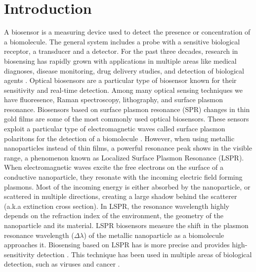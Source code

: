 \chapter{Introduction} \label{chap:intro}

A biosensor is a measuring device used to detect the presence or concentration of a biomolecule. The general system includes 
a probe with a sensitive biological receptor, a transducer and a detector. For the past three decades, research in biosensing 
has rapidly grown with applications in multiple areas like medical diagnoses, disease monitoring, drug delivery studies, 
and detection of biological agents \cite{Turner2000, Mohanty2006, Mehrotra2016}. Optical biosensors are a particular type of biosensor 
known for their sensitivity and real-time detection. Among many optical sensing techniques we have fluoresence, Raman spectroscopy, lithography, 
and surface plasmon resonance. Biosensors based on surface plasmon resonance (SPR) changes in thin gold films are some of the most 
commonly used optical biosensors.  These sensors exploit a particular type of electromagnetic waves called surface plasmon polaritons for the
detection of a biomolecule \cite{Homola2008}. However, when using metallic nanoparticles instead of thin films, a powerful resonance peak 
shows in the visible range, a phenomenon known as Localized Surface Plasmon Resonance (LSPR). When electromagnetic waves excite the free electrons on 
the surface of a conductive nanoparticle, they resonate with the incoming electric field forming plasmons. Most of the incoming energy is either 
absorbed by the nanoparticle, or scattered in multiple directions, creating a large shadow behind the scatterer (a.k.a extinction cross section). In LSPR, 
the resonance wavelength highly depends on the refraction index of the environment, the geometry of the nanoparticle and its material. LSPR biosensors measure 
the shift in the plasmon resonance wavelength ($\Delta\lambda$) of the metallic nanoparticle as a biomolecule approaches it. Biosensing based on LSPR has 
is more precise and provides high-sensitivity detection \cite{Sepulveda2009}. This technique has been used in multiple areas of biological detection, 
such as viruses and cancer \cite{Wang2010, Liu2014, Zhu2016}. 

